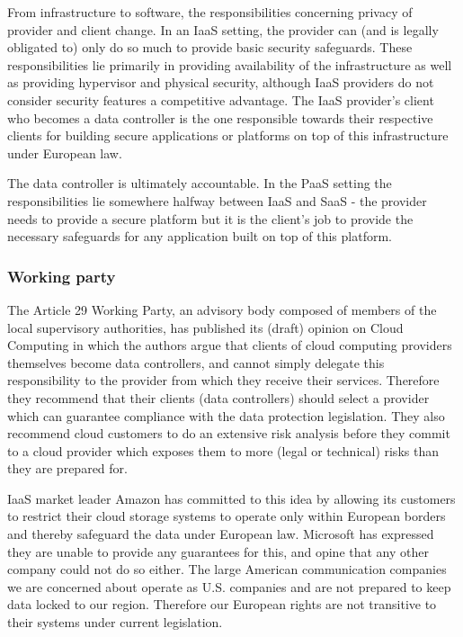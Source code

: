 \documentclass[11pt, a4paper]{article}
\begin{document}
From infrastructure to software, the responsibilities concerning privacy of provider and client change.
In an IaaS setting, the provider can (and is legally obligated to) only do so much to provide basic security safeguards.
These responsibilities lie primarily in providing availability of the infrastructure as well as providing hypervisor and physical security, although IaaS providers do not consider security features a competitive advantage.
The IaaS provider's client who becomes a data controller is the one responsible towards their respective clients for building secure applications or platforms on top of this infrastructure under European law.

The data controller is ultimately accountable.
In the PaaS setting the responsibilities lie somewhere halfway between IaaS and SaaS - the provider needs to provide a secure platform but it is the client's job to provide the necessary safeguards for any application built on top of this platform.

\subsubsection{Working party}
The Article 29 Working Party, an advisory body composed of members of the local supervisory authorities, has published its (draft) opinion on Cloud Computing in which the authors argue that clients of cloud computing providers themselves become data controllers, and cannot simply delegate this responsibility to the provider from which they receive their services.
Therefore they recommend that their clients (data controllers) should select a provider which can guarantee compliance with the data protection legislation.
They also recommend cloud customers to do an extensive risk analysis before they commit to a cloud provider which exposes them to more (legal or technical) risks than they are prepared for.

IaaS market leader Amazon has committed to this idea by allowing its customers to restrict their cloud storage systems to operate only within European borders and thereby safeguard the data under European law.
Microsoft has expressed they are unable to provide any guarantees for this, and opine that any other company could not do so either.
The large American communication companies we are concerned about operate as U.S. companies and are not prepared to keep data locked to our region. Therefore our European rights are not transitive to their systems under current legislation.
\end{document}

